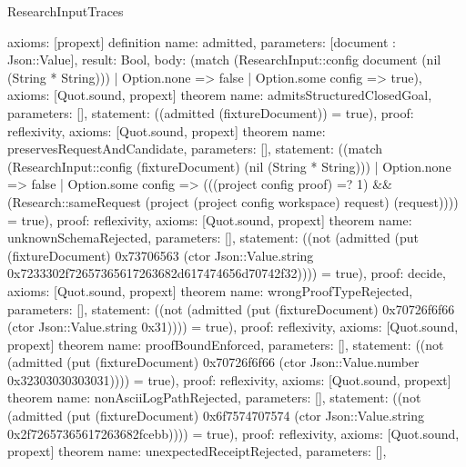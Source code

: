 \begin{lexlean}{ResearchInputTraces}
\begin{semanticmodule}
{ axioms: [propext]
}
definition{
 name: admitted,
 parameters: [document : Json::Value],
 result: Bool,
 body: (match (ResearchInput::config document (nil (String * String))) | Option.none => false | Option.some config => true),
 axioms: [Quot.sound, propext]
}
theorem{
 name: admitsStructuredClosedGoal,
 parameters: [],
 statement: ((admitted (fixtureDocument)) = true),
 proof: reflexivity{},
 axioms: [Quot.sound, propext]
}
theorem{
 name: preservesRequestAndCandidate,
 parameters: [],
 statement: ((match (ResearchInput::config (fixtureDocument) (nil (String * String))) | Option.none => false | Option.some config => (((project config proof) =? 1) && (Research::sameRequest (project (project config workspace) request) (request)))) = true),
 proof: reflexivity{},
 axioms: [Quot.sound, propext]
}
theorem{
 name: unknownSchemaRejected,
 parameters: [],
 statement: ((not (admitted (put (fixtureDocument) 0x73706563 (ctor Json::Value.string 0x7233302f72657365617263682d617474656d70742f32)))) = true),
 proof: decide{},
 axioms: [Quot.sound, propext]
}
theorem{
 name: wrongProofTypeRejected,
 parameters: [],
 statement: ((not (admitted (put (fixtureDocument) 0x70726f6f66 (ctor Json::Value.string 0x31)))) = true),
 proof: reflexivity{},
 axioms: [Quot.sound, propext]
}
theorem{
 name: proofBoundEnforced,
 parameters: [],
 statement: ((not (admitted (put (fixtureDocument) 0x70726f6f66 (ctor Json::Value.number 0x32303030303031)))) = true),
 proof: reflexivity{},
 axioms: [Quot.sound, propext]
}
theorem{
 name: nonAsciiLogPathRejected,
 parameters: [],
 statement: ((not (admitted (put (fixtureDocument) 0x6f7574707574 (ctor Json::Value.string 0x2f72657365617263682fcebb)))) = true),
 proof: reflexivity{},
 axioms: [Quot.sound, propext]
}
theorem{
 name: unexpectedReceiptRejected,
 parameters: [],
}
\end{semanticmodule}
\end{lexlean}
